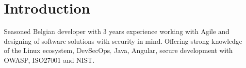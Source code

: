 \section{Introduct\textcolor{mycolor}{ion}}
\begin{center}
  Seasoned Belgian developer with 3 years experience working with Agile and designing of software solutions with security in mind. 
  Offering strong knowledge of the Linux ecosystem, DevSecOps, Java, Angular, secure development with OWASP, ISO27001 and NIST.
\end{center}

